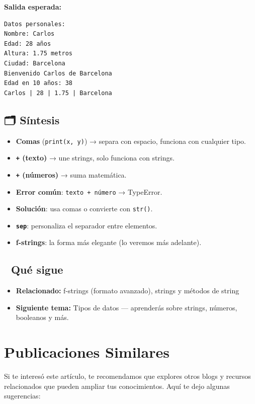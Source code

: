 \documentclass[
  doc,
  floatsintext,
  longtable,
  a4paper,
  nolmodern,
  notxfonts,
  notimes,
  12pt,
  colorlinks=true,linkcolor=blue,citecolor=blue,urlcolor=blue]{apa7}
\providecommand{\tightlist}{%
  \setlength{\itemsep}{0pt}\setlength{\parskip}{0pt}}
\begin{document}
\textbf{Salida esperada:}

\begin{verbatim}
Datos personales:
Nombre: Carlos
Edad: 28 años
Altura: 1.75 metros
Ciudad: Barcelona
Bienvenido Carlos de Barcelona
Edad en 10 años: 38
Carlos | 28 | 1.75 | Barcelona
\end{verbatim}

\subsection{🗂️ Síntesis}\label{suxedntesis}

\begin{itemize}
\tightlist
\item
  \textbf{Comas} (\texttt{print(x,\ y)}) → separa con espacio, funciona
  con cualquier tipo.
\item
  \textbf{\texttt{+} (texto)} → une strings, solo funciona con strings.
\item
  \textbf{\texttt{+} (números)} → suma matemática.
\item
  \textbf{Error común}: \texttt{texto\ +\ número} → TypeError.
\item
  \textbf{Solución}: usa comas o convierte con \texttt{str()}.
\item
  \textbf{\texttt{sep}}: personaliza el separador entre elementos.
\item
  \textbf{f-strings}: la forma más elegante (lo veremos más adelante).
\end{itemize}

\subsection{🔗 Qué sigue}\label{quuxe9-sigue}

\begin{itemize}
\tightlist
\item
  \textbf{Relacionado:} f-strings (formato avanzado), strings y métodos
  de string
\item
  \textbf{Siguiente tema:} Tipos de datos --- aprenderás sobre strings,
  números, booleanos y más.
\end{itemize}

\section{Publicaciones Similares}\label{publicaciones-similares}

Si te interesó este artículo, te recomendamos que explores otros blogs y
recursos relacionados que pueden ampliar tus conocimientos. Aquí te dejo
algunas sugerencias:
\end{document}
